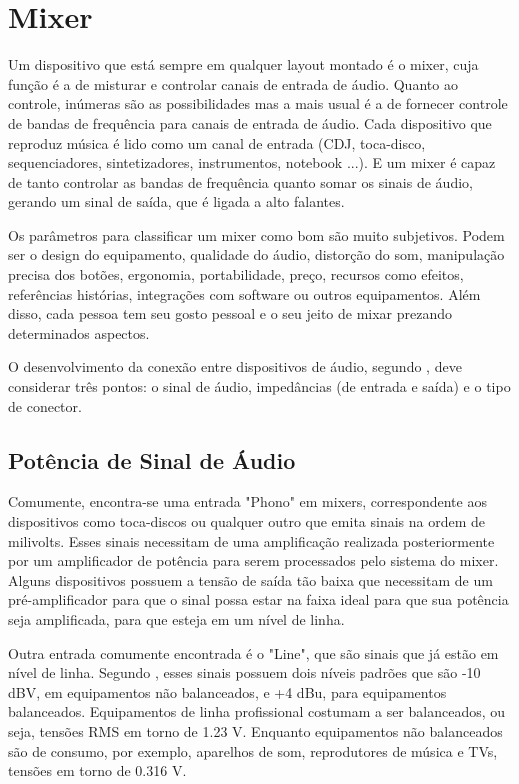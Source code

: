 \section{Mixer}
Um dispositivo que está sempre em qualquer layout montado é o mixer, cuja função é a de misturar e controlar canais de entrada de áudio. Quanto ao controle, inúmeras são as possibilidades mas a mais usual é a de fornecer controle de bandas de frequência para canais de entrada de áudio. Cada dispositivo que reproduz música é lido como um canal de entrada (CDJ, toca-disco, sequenciadores, sintetizadores, instrumentos, notebook ...). E um mixer é capaz de tanto controlar as bandas de frequência quanto somar os sinais de áudio, gerando um sinal de saída, que é ligada a alto falantes. 
\par
Os parâmetros para classificar um mixer como bom são muito subjetivos. Podem ser o design do equipamento, qualidade do áudio, distorção do som, manipulação precisa dos botões, ergonomia, portabilidade, preço, recursos como efeitos, referências histórias, integrações com software ou outros equipamentos. Além disso, cada pessoa tem seu gosto pessoal e o seu jeito de mixar prezando determinados aspectos.
\par
O desenvolvimento da conexão entre dispositivos de áudio, segundo \cite{winer}, deve considerar três pontos: o sinal de áudio, impedâncias (de entrada e saída) e o tipo de conector.

\subsection{Potência de Sinal de Áudio}

Comumente, encontra-se uma entrada "Phono" em mixers, correspondente aos dispositivos como toca-discos ou qualquer outro que emita sinais na ordem de milivolts. Esses sinais necessitam de uma amplificação realizada posteriormente por um amplificador de potência para serem processados pelo sistema do mixer. Alguns dispositivos possuem a tensão de saída tão baixa que necessitam de um pré-amplificador para que o sinal possa estar na faixa ideal para que sua potência seja amplificada, para que esteja em um nível de linha.
\par
Outra entrada comumente encontrada é o "Line", que são sinais que já estão em nível de linha. Segundo \cite{winer}, esses sinais possuem dois níveis padrões que são -10 dBV, em equipamentos não balanceados, e +4 dBu, para equipamentos balanceados. Equipamentos de linha profissional costumam a ser balanceados, ou seja, tensões RMS em torno de 1.23 V. Enquanto equipamentos não balanceados são de consumo, por exemplo, aparelhos de som, reprodutores de música e TVs, tensões em torno de 0.316 V.

